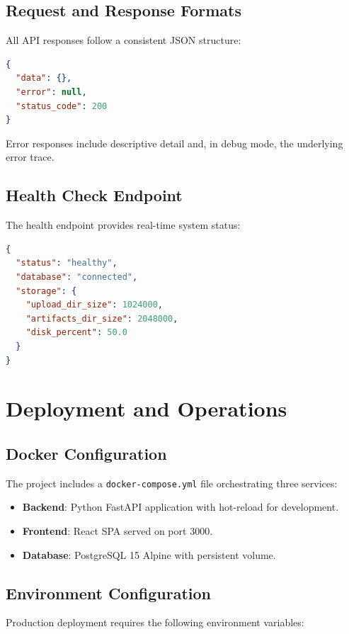\documentclass[11pt,a4paper]{article}
\begin{document}
\subsection{Request and Response Formats}
All API responses follow a consistent JSON structure:

\begin{lstlisting}[language=JSON, caption={Standard response format}]
{
  "data": {},
  "error": null,
  "status_code": 200
}
\end{lstlisting}

Error responses include descriptive detail and, in debug mode, the underlying error trace.

\subsection{Health Check Endpoint}
The health endpoint provides real-time system status:

\begin{lstlisting}[language=JSON, caption={Health check response}]
{
  "status": "healthy",
  "database": "connected",
  "storage": {
    "upload_dir_size": 1024000,
    "artifacts_dir_size": 2048000,
    "disk_percent": 50.0
  }
}
\end{lstlisting}

\newpage
\section{Deployment and Operations}
\label{sec:deployment}

\subsection{Docker Configuration}
The project includes a \texttt{docker-compose.yml} file orchestrating three services:

\begin{itemize}[leftmargin=2em]
    \item \textbf{Backend}: Python FastAPI application with hot-reload for development.
    \item \textbf{Frontend}: React SPA served on port 3000.
    \item \textbf{Database}: PostgreSQL 15 Alpine with persistent volume.
\end{itemize}

\subsection{Environment Configuration}
Production deployment requires the following environment variables:
\end{document}
